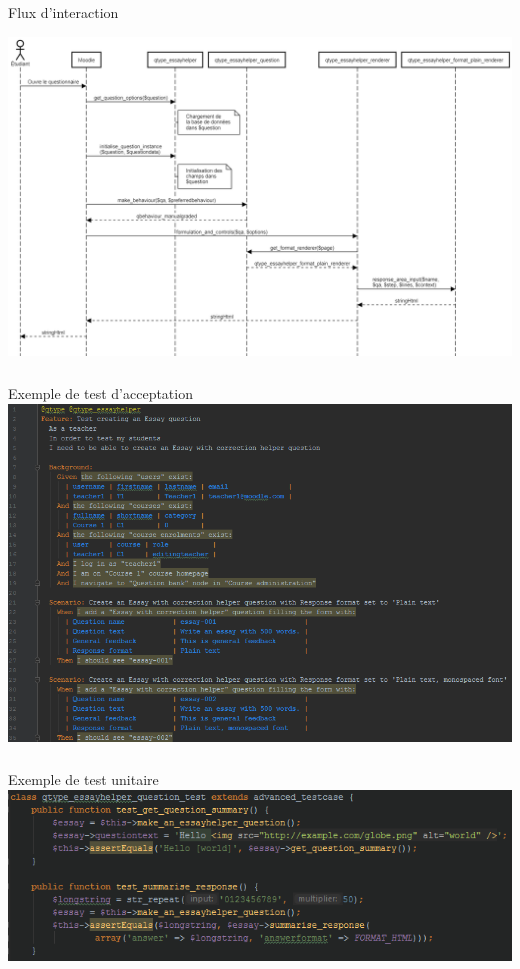 \documentclass{beamer}
\begin{document}
  \begin{frame}
  \frametitle{\insertsection}
  \alert{Flux d'interaction}
\vfill
    \begin{center}
    \includegraphics[scale=0.2]{../images/diagramme-flux.png}
    \end{center}
  \end{frame}
  
  \begin{frame}
    \frametitle{\insertsection}
    \alert{Exemple de test d'acceptation}
    \vfill
    \includegraphics[scale=0.4]{../images/test-behat.png}
  \end{frame}
  
  \begin{frame}
    \frametitle{\insertsection}
    \alert{Exemple de test unitaire}
    \vfill
    \includegraphics[scale=0.4]{../images/test-unit.png}
  \end{frame}
  
\end{document}
